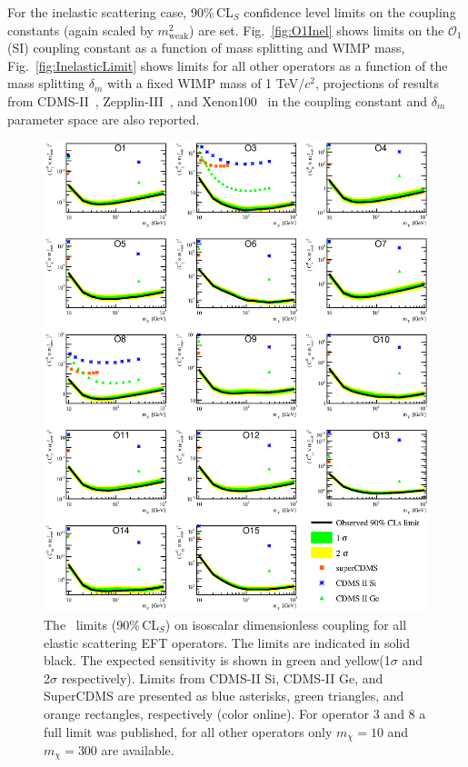For the inelastic scattering case,  90\%\,CL$_S$ confidence level limits on the coupling constants 
(again scaled by $m_\mathrm{weak}^2$) are set. Fig.~\ref{fig:O1Inel} shows limits on the $\mathcal{O}_1$ (SI) coupling constant as a function of mass splitting and WIMP mass, Fig.~\ref{fig:InelasticLimit} shows limits for all other operators as a function of the mass splitting $\delta_m$ with a fixed WIMP mass of 1 TeV/$c^2$,  
projections of results from CDMS-II~\cite{CDMS_Inelastic}, Zepplin-III~\cite{Zepplin_Inel}, and Xenon100~\cite{XENON_Inelastic_WIMP} in the coupling constant and $\delta_m$ parameter space are also reported.
  

\begin{figure}
\begin{minipage}{1.\linewidth}{}
\centerline{\includegraphics[width=\textwidth,height=0.99\textheight,keepaspectratio]{Figures/ElasticAllLimitCDMS.eps}}
\end{minipage}
\caption{The \Xehund\ limits (90\%\,CL$_S$) on isoscalar dimensionless coupling for all elastic scattering EFT operators. The limits are indicated in solid black. The expected sensitivity is shown in green and yellow(1$\sigma$ and 2$\sigma$ respectively). Limits from CDMS-II Si, CDMS-II Ge, and SuperCDMS \cite{CDMSEFT} are presented as blue asterisks, green triangles, and orange rectangles, respectively (color online). For operator 3 and 8 a full limit was published, for all other operators only $m_\chi = 10$ and $m_\chi =300$ are available.}
\label{fig:elasticLimit}
\end{figure}

